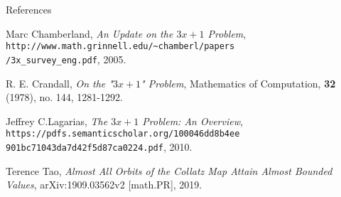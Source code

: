 \documentclass[hyperref={colorlinks,allcolors=black}]{beamer}
\begin{document}
\begin{frame}{References}
\begin{thebibliography}{4}

 Marc Chamberland, 
    \textit{An Update on the $3x+1$ Problem},
        \texttt{http://www.math.grinnell.edu/\~{}chamberl/papers\\
        /3x\_survey\_eng.pdf},
    2005.

 R. E. Crandall, \textit{On the "$3x+1$" Problem},
    Mathematics of Computation, \textbf{32} (1978), no. 144, 1281-1292.

 Jeffrey C.Lagarias, 
    \textit{The $3x+1$ Problem: An Overview},
    \texttt{https://pdfs.semanticscholar.org/100046dd8b4ee\\
        901bc71043da7d42f5d87ca0224.pdf},
    2010.

 Terence Tao, \textit{Almost All Orbits of the Collatz Map Attain
    Almost Bounded Values}, arXiv:1909.03562v2 [math.PR], 2019.

\end{thebibliography}
\end{frame}
\end{document}
